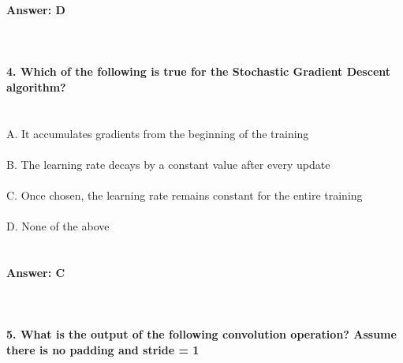 \documentclass[prl,twocolumn,showpacs,preprintnumbers,superscriptaddress]{revtex4}
\theoremstyle{plain}
\theoremstyle{definition}
\begin{document}
\begin{widetext}
\textbf{Answer: D}
\\
\\
\\
\\
\textbf{4. Which of the following is true for the Stochastic Gradient Descent algorithm?}
\\
\\
\\
A. It accumulates gradients from the beginning of the training
\\
\\
B. The learning rate decays by a constant value after every update
\\
\\
C. Once chosen, the learning rate remains constant for the entire training
\\
\\
D. None of the above
\\
\\
\\
\textbf{Answer: C}
\\
\\
\\
\\
\textbf{5. What is the output of the following convolution operation? Assume there is no padding and stride = 1}
\\

\end{widetext}
\end{document}
